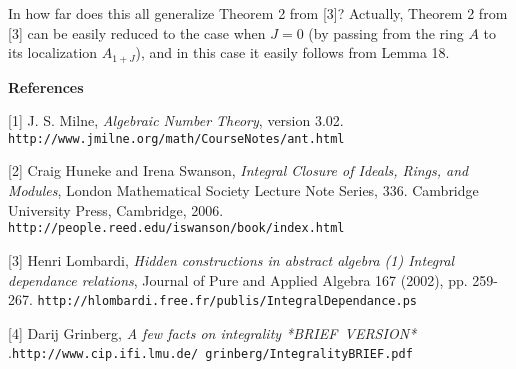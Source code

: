 \documentclass[12pt,final,notitlepage,onecolumn]{article}%
\begin{document}
In how far does this all generalize Theorem 2 from [3]? Actually, Theorem 2
from [3] can be easily reduced to the case when $J=0$ (by passing from the
ring $A$ to its localization $A_{1+J}$), and in this case it easily follows
from Lemma 18.

\begin{center}
\color{blue} \textbf{References} \color{black}
\end{center}

[1] J. S. Milne, \textit{Algebraic Number Theory}, version 3.02.\newline%
\texttt{http://www.jmilne.org/math/CourseNotes/ant.html}

[2] Craig Huneke and Irena Swanson, \textit{Integral Closure of Ideals, Rings,
and Modules}, London Mathematical Society Lecture Note Series, 336. Cambridge
University Press, Cambridge, 2006.\newline%
\texttt{http://people.reed.edu/iswanson/book/index.html}

[3] Henri Lombardi, \textit{Hidden constructions in abstract algebra (1)
Integral dependance relations}, Journal of Pure and Applied Algebra 167
(2002), pp. 259-267.\newline%
\texttt{http://hlombardi.free.fr/publis/IntegralDependance.ps}

[4] Darij Grinberg, \textit{A few facts on integrality *BRIEF\ VERSION*}%
.\newline\texttt{http://www.cip.ifi.lmu.de/%
grinberg/IntegralityBRIEF.pdf}
\end{document}
